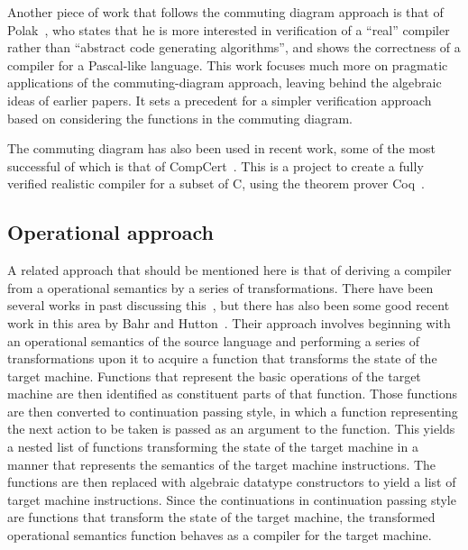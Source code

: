 \documentclass[a4paper,10pt]{report}
\begin{document}
Another piece of work that follows the commuting diagram approach is
that of Polak~\cite{polak1981}, who states that he is more interested
in verification of a ``real'' compiler rather than ``abstract code
generating algorithms'', and shows the correctness of a compiler for a
Pascal-like language.
This work focuses much more on pragmatic applications of the
commuting-diagram approach, leaving behind the algebraic ideas of
earlier papers.
It sets a precedent for a simpler verification approach based on
considering the functions in the commuting diagram.

The commuting diagram has also been used in recent work, some of the
most successful of which is that of CompCert~\cite{leroy2009a,
  leroy2009b, leroy2012}.
This is a project to create a fully verified realistic compiler for a
subset of C, using the theorem prover Coq~\cite{coq2004}.

\subsection{Operational approach}
\label{operational-approach-subsection}

A related approach that should be mentioned here is that of deriving a
compiler from a operational semantics by a series of transformations.
There have been several works in past discussing this~\cite{wand1982,
  meijer1992a, ager2003}, but there has also been some good recent
work in this area by Bahr and Hutton~\cite{bahr2015}.
Their approach involves beginning with an operational semantics of the
source language and performing a series of transformations upon it to
acquire a function that transforms the state of the target machine.
Functions that represent the basic operations of the target machine
are then identified as constituent parts of that function.
Those functions are then converted to continuation passing style, in
which a function representing the next action to be taken is passed as
an argument to the function.
This yields a nested list of functions transforming the state of the
target machine in a manner that represents the semantics of the target
machine instructions.
The functions are then replaced with algebraic datatype constructors
to yield a list of target machine instructions.
Since the continuations in continuation passing style are functions
that transform the state of the target machine, the transformed
operational semantics function behaves as a compiler for the target
machine.
\end{document}
